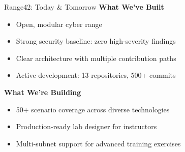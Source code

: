\documentclass[aspectratio=169]{beamer}
\begin{document}
\begin{frame}[squeeze]{Range42: Today \& Tomorrow \; \faCheckCircle}
  \textbf{What We've Built}
  \begin{itemize}
    \item Open, modular cyber range
    \item Strong security baseline: zero high-severity findings
    \item Clear architecture with multiple contribution paths
    \item Active development: 13 repositories, 500+ commits
  \end{itemize}
  \vspace{2mm}
  \textbf{What We're Building}
  \begin{itemize}
    \item 50+ scenario coverage across diverse technologies
    \item Production-ready lab designer for instructors
    \item Multi-subnet support for advanced training exercises
  \end{itemize}
\end{frame}
\end{document}
